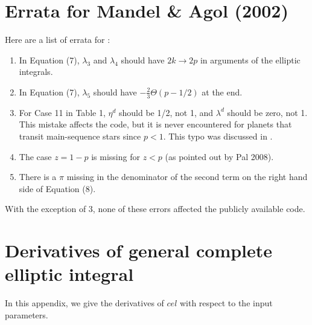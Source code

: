 \documentclass[modern]{aastex61}
\begin{document}


\appendix

\section{Errata for Mandel \& Agol (2002)}

Here are a list of errata for \citet{MandelAgol2002}:
\begin{enumerate}
\item In Equation (7), $\lambda_3$ and $\lambda_4$ should have $2k \rightarrow
2p$ in arguments of the elliptic integrals.

\item In Equation (7), $\lambda_5$ should have $- \frac{2}{3}\Theta(p-1/2)$
at the end.

\item For Case 11 in Table 1, $\eta^d$ should be 1/2, not 1, and
$\lambda^d$ should be zero, not 1.  This mistake affects the code,
but it is never encountered for planets that transit main-sequence
stars since $p<1$.  This typo was discussed in \citet{Eastman2013}.

\item The case $z=1-p$ is missing for $z<p$ (as pointed out by
Pal 2008).

\item There is a $\pi$ missing in the denominator of the second term
on the right hand side of Equation (8).
\end{enumerate}

With the exception of 3, none of these errors affected the publicly
available code.

\section{Derivatives of general complete elliptic integral}
\label{app:cel_derivatives}

In this appendix, we give the derivatives of $cel$ with respect to
the input parameters.

\end{document}
